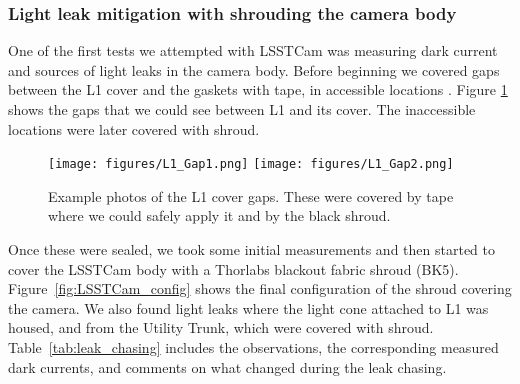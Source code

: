 \subsubsection{Light leak mitigation with shrouding the camera
body}\label{light-leak-mitigation-with-shrouding-the-camera-body}

One of the first tests we attempted with LSSTCam was measuring dark
current and sources of light leaks in the camera body. Before beginning we covered gaps between the L1 cover and the gaskets with tape, in accessible locations . Figure \ref{fig:L1_Gaps} shows the gaps that we could see between L1 and its cover. The inaccessible locations were later covered with shroud.

\begin{figure}[htbp]
\centering
\texttt{[image: figures/L1\_Gap1.png]}
\texttt{[image: figures/L1\_Gap2.png]}
\caption{Example photos of the L1 cover gaps. These were covered by tape where we could safely apply it and by the black shroud.}
\label{fig:L1_Gaps}
\end{figure}

Once these were sealed, we took some initial measurements and then
started to cover the LSSTCam body with a Thorlabs blackout fabric shroud (BK5). Figure~\ref{fig:LSSTCam_config} shows the final configuration of the shroud covering the
camera.
We also found light leaks
where the light cone attached to L1 was housed, and from the Utility
Trunk, which were covered with shroud. Table~\ref{tab:leak_chasing} includes the observations, the corresponding measured dark
currents, and comments on what changed during the leak chasing.

